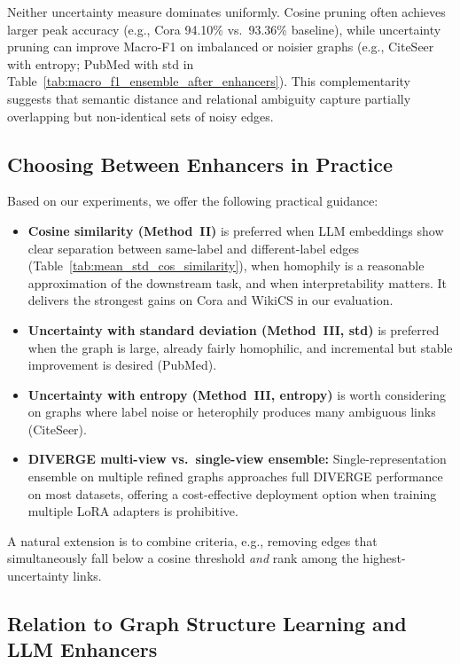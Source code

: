 Neither uncertainty measure dominates uniformly. Cosine pruning often achieves larger
peak accuracy (e.g., Cora 94.10\% vs.\ 93.36\% baseline), while uncertainty pruning
can improve Macro-F1 on imbalanced or noisier graphs (e.g., CiteSeer with entropy;
PubMed with std in Table~\ref{tab:macro_f1_ensemble_after_enhancers}). This
complementarity suggests that semantic distance and relational ambiguity capture
partially overlapping but non-identical sets of noisy edges.


\subsection{Choosing Between Enhancers in Practice}
\label{sec:disc-when-to-use}

Based on our experiments, we offer the following practical guidance:

\begin{itemize}
\item \textbf{Cosine similarity (Method~II)} is preferred when LLM embeddings show
  clear separation between same-label and different-label edges
  (Table~\ref{tab:mean_std_cos_similarity}), when homophily is a reasonable approximation
  of the downstream task, and when interpretability matters. It delivers the strongest
  gains on Cora and WikiCS in our evaluation.

\item \textbf{Uncertainty with standard deviation (Method~III, std)} is preferred when
  the graph is large, already fairly homophilic, and incremental but stable improvement
  is desired (PubMed).

\item \textbf{Uncertainty with entropy (Method~III, entropy)} is worth considering on
  graphs where label noise or heterophily produces many ambiguous links (CiteSeer).

\item \textbf{DIVERGE multi-view vs.\ single-view ensemble:} Single-representation
  ensemble on multiple refined graphs approaches full DIVERGE performance on most
  datasets, offering a cost-effective deployment option when training multiple LoRA
  adapters is prohibitive.
\end{itemize}

A natural extension is to combine criteria, e.g., removing edges that simultaneously
fall below a cosine threshold \emph{and} rank among the highest-uncertainty links.


\subsection{Relation to Graph Structure Learning and LLM Enhancers}
\label{sec:disc-prior-work}

